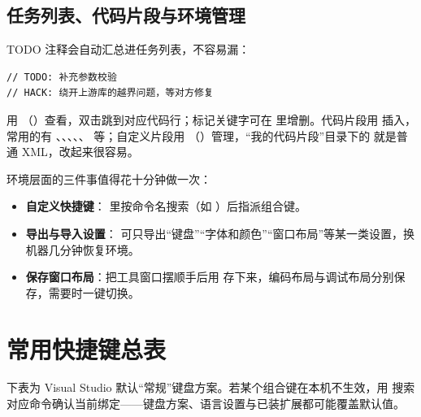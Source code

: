 \subsection{任务列表、代码片段与环境管理}
TODO 注释会自动汇总进任务列表，不容易漏：
\begin{lstlisting}[style=cppstyle]
// TODO: 补充参数校验
// HACK: 绕开上游库的越界问题，等对方修复
\end{lstlisting}
用 （）查看，双击跳到对应代码行；标记关键字可在  里增删。代码片段用  插入，常用的有 、、、、、 等；自定义片段用 （）管理，“我的代码片段”目录下的  就是普通 XML，改起来很容易。

环境层面的三件事值得花十分钟做一次：
\begin{itemize}
  \item \textbf{自定义快捷键}： 里按命令名搜索（如 ）后指派组合键。
  \item \textbf{导出与导入设置}： 可只导出“键盘”“字体和颜色”“窗口布局”等某一类设置，换机器几分钟恢复环境。
  \item \textbf{保存窗口布局}：把工具窗口摆顺手后用  存下来，编码布局与调试布局分别保存，需要时一键切换。
\end{itemize}
\section{常用快捷键总表}
\begin{note}[说明]
下表为 Visual Studio 默认“常规”键盘方案。若某个组合键在本机不生效，用  搜索对应命令确认当前绑定——键盘方案、语言设置与已装扩展都可能覆盖默认值。
\end{note}
